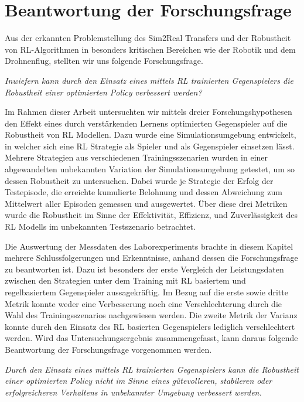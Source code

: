 \section{Beantwortung der Forschungsfrage}

Aus der erkannten Problemstellung des Sim2Real Transfers und der Robustheit von RL-Algorithmen in besonders kritischen Bereichen wie der Robotik und dem Drohnenflug, stellten wir uns folgende Forschungsfrage.

\textit{Inwiefern kann durch den Einsatz eines mittels RL trainierten Gegenspielers die Robustheit einer optimierten Policy verbessert werden?}

Im Rahmen dieser Arbeit untersuchten wir mittels dreier Forschungshypothesen den Effekt eines durch verstärkenden Lernens optimierten Gegenspieler auf die Robustheit von RL Modellen.
Dazu wurde eine Simulationsumgebung entwickelt, in welcher sich eine RL Strategie als Spieler und als Gegenspieler einsetzen lässt.
Mehrere Strategien aus verschiedenen Trainingsszenarien wurden in einer abgewandelten unbekannten Variation der Simulationsumgebung getestet, um so dessen Robustheit zu untersuchen.
Dabei wurde je Strategie der Erfolg der Testepisode, die erreichte kumulierte Belohnung und dessen Abweichung zum Mittelwert aller Episoden gemessen und ausgewertet. 
Über diese drei Metriken wurde die Robustheit im Sinne der Effektivität, Effizienz, und Zuverlässigkeit des RL Modells im unbekannten Testszenario betrachtet.

Die Auswertung der Messdaten des Laborexperiments brachte in diesem Kapitel mehrere Schlussfolgerungen und Erkenntnisse, anhand dessen die Forschungsfrage zu beantworten ist.
Dazu ist besonders der erste Vergleich der Leistungsdaten zwischen den Strategien unter dem Training mit RL basiertem und regelbasiertem Gegenspieler aussagekräftig.
Im Bezug auf die erste sowie dritte Metrik konnte weder eine Verbesserung noch eine Verschlechterung durch die Wahl des Trainingsszenarios nachgewiesen werden.
Die zweite Metrik der Varianz konnte durch den Einsatz des RL basierten Gegenspielers lediglich verschlechtert werden.
Wird das Untersuchungsergebnis zusammengefasst, kann daraus folgende Beantwortung der Forschungsfrage vorgenommen werden.

\textit{Durch den Einsatz eines mittels RL trainierten Gegenspielers kann die Robustheit einer optimierten Policy nicht im Sinne eines gütevolleren, stabileren oder erfolgreicheren Verhaltens in unbekannter Umgebung verbessert werden.}

